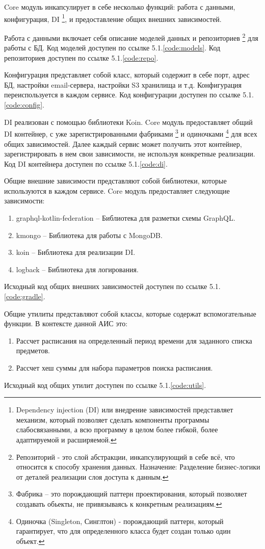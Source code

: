 Core модуль инкапсулирует в себе несколько функций: работа с данными, конфигурация, DI
\footnote{Dependency injection (DI) или внедрение зависимостей представляет механизм, который позволяет сделать компоненты программы слабосвязанными, 
а всю программу в целом более гибкой, более адаптируемой и расширяемой.
}, и предоставление общих внешних зависимостей.

Работа с данными включает себя описание моделей данных и репозиториев
\footnote{Репозиторий - это слой абстракции, инкапсулирующий в себе всё, что относится к способу хранения данных. 
Назначение: Разделение бизнес-логики от деталей реализации слоя доступа к данным.}
для работы с БД. Код моделей доступен по ссылке 5.1.\ref{code:models}. Код репозиториев доступен по ссылке 5.1.\ref{code:repo}.

Конфигурация представляет собой класс, который содержит в себе порт, 
адрес БД, настройки email-сервера, настройки S3 хранилища и т.д.
Конфигурация переиспользуется в каждом сервисе.
Код конфигурации доступен по ссылке 5.1.\ref{code:config}.

DI реализован с помощью библиотеки Koin. Core модуль предоставляет общий DI контейнер, 
с уже зарегистрированными фабриками
\footnote{Фабрика – это порождающий паттерн проектирования, который позволяет создавать обьекты, не привязываясь к конкретным реализациям.}
и одиночками 
\footnote{Одиночка (Singleton, Синглтон) - порождающий паттерн, который гарантирует, что для определенного класса будет создан только один объект.}
для всех общих зависимостей. Далее каждый сервис может получить этот контейнер, 
зарегистрировать в нем свои зависимости, не используя конкретные реализации.
Код DI контейнера доступен по ссылке 5.1.\ref{code:di}.

Общие внешние зависимости представляют собой библиотеки, которые используются в каждом сервисе. 
Core модуль предоставляет следующие зависимости:
\begin{enumerate}
  \item graphql-kotlin-federation -- Библиотека для разметки схемы GraphQL.
  \item kmongo -- Библиотека для работы с MongoDB.
  \item koin -- Библиотека для реализации DI.
  \item logback -- Библиотека для логирования.
\end{enumerate}
Исходный код общих внешних зависимостей доступен по ссылке 5.1.\ref{code:gradle}.

Общие утилиты представляют собой классы, которые содержат вспомогательные функции. В контексте данной АИС это:
\begin{enumerate}
  \item Рассчет расписания на определенный период времени для заданного списка предметов.
  \item Рассчет хеш суммы для набора параметров поиска расписания.
\end{enumerate}
Исходный код общих утилит доступен по ссылке 5.1.\ref{code:utils}.


